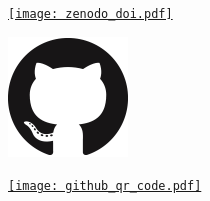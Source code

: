 \documentclass[princeton,portrait]{a0poster}
\begin{document}
\begin{minipage}[b]{\linewidth}
\begin{minipage}{0.18\linewidth}
   \vspace{-0.5cm}
   \begin{center}
    \href{https://doi.org/10.5281/zenodo.1169739}{\texttt{[image: zenodo\_doi.pdf]}}
   \end{center}
 \end{minipage}%
 \begin{minipage}{0.18\linewidth}
  \begin{minipage}{0.25\linewidth}
   \begin{flushleft}
    \href{https://github.com/scikit-hep/pyhf}{\includegraphics[width=\linewidth]{GitHub_logo.png}}
   \end{flushleft}
  \end{minipage}%
  \begin{minipage}{0.25\linewidth}
   \begin{flushleft}
    \href{https://github.com/scikit-hep/pyhf}{\texttt{[image: github\_qr\_code.pdf]}}
   \end{flushleft}
  \end{minipage}%
 \end{minipage}%
 \vspace{-1cm}
\end{minipage}
\end{document}

